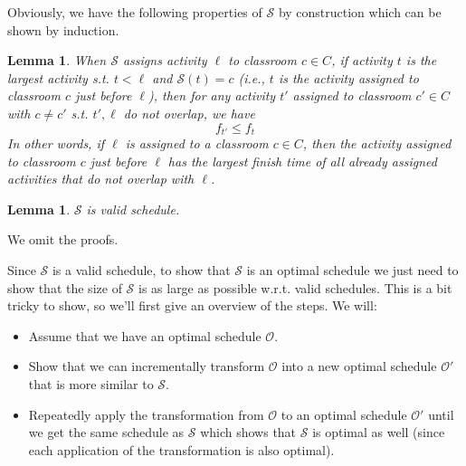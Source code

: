 \documentclass{article}
\theoremstyle{plain}%
\newtheorem{lem}[thm]{Lemma}
\theoremstyle{definition}
\theoremstyle{remark}
\begin{document}
Obviously, we have the following properties of $\mathcal{S}$ by construction
    which can be shown by induction.
\begin{lem}
    \label{Sinvariant}
    When $\mathcal{S}$ assigns activity $\ell$ to classroom $c \in C$,
        if activity $t$ is the largest activity s.t. $t < \ell$ and $\mathcal{S}(t) = c$
            (i.e., $t$ is the activity assigned to classroom $c$ just before $\ell$),
            then for any activity $t'$ assigned to classroom $c' \in C$ with 
                $c \neq c'$ s.t. $t',\ell$ do not overlap, we have
            \begin{equation}
                f_{t'} \le f_{t}
            \end{equation}
    In other words, if $\ell$ is assigned to a classroom $c \in C$,
        then the activity assigned to classroom $c$ just before $\ell$ has the
        largest finish time of all already assigned activities that do not overlap with $\ell$.
\end{lem}
\begin{lem}
    \label{Svalid}
    $\mathcal{S}$ is valid schedule.
\end{lem}

We omit the proofs.

Since $\mathcal{S}$ is a valid schedule, to show that $\mathcal{S}$
    is an optimal schedule we just need to show that the size of $\mathcal{S}$
    is as large as possible w.r.t. valid schedules.
This is a bit tricky to show, so we'll first give an overview of the steps.
We will:
\begin{itemize}
    \item Assume that we have an optimal schedule $\mathcal{O}$.
    \item Show that we can incrementally transform $\mathcal{O}$ into a new
        optimal schedule $\mathcal{O}'$ that is more similar to
        $\mathcal{S}$.
    \item Repeatedly apply the transformation from $\mathcal{O}$ to an optimal
        schedule $\mathcal{O}'$ until we get the same schedule as $\mathcal{S}$
        which shows that $\mathcal{S}$ is optimal as well (since each
        application of the transformation is also optimal).
\end{itemize}
\end{document}
